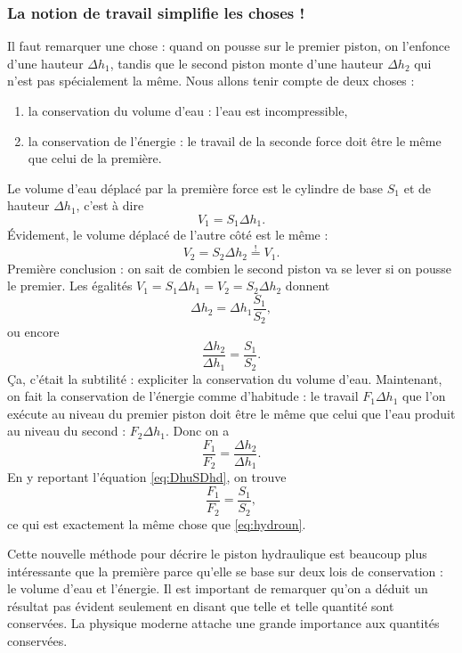 \documentclass[a4paper,12pt]{book}
\theoremstyle{mes_exemples}	\newtheorem{exemple}[numtho]{Exemple}
\theoremstyle{mes_tho}
\begin{document}
\subsubsection{La notion de travail simplifie les choses !}

Il faut remarquer une chose : quand on pousse sur le premier piston, on l'enfonce d'une hauteur $\Delta h_1$, tandis que le second piston monte d'une hauteur $\Delta h_2$ qui n'est pas spécialement la même. Nous allons tenir compte de deux choses :

\begin{enumerate}
\item la conservation du volume d'eau : l'eau est incompressible,
\item la conservation de l'énergie : le travail de la seconde force doit être le même que celui de la première. 
\end{enumerate}
Le volume d'eau déplacé par la première force est le cylindre de base $S_1$ et de hauteur $\Delta h_1$, c'est à dire
\[
   V_1=S_1\Delta h_1.
\]
Évidement, le volume déplacé de l'autre côté est le même :
\[
   V_2=S_2\Delta h_2\stackrel{!}{=}V_1.
\] 
Première conclusion : on sait de combien le second piston va se lever si on pousse le premier. Les égalités $V_1=S_1\Delta h_1=V_2=S_2\Delta h_2$ donnent 
\[
\Delta h_2=\Delta h_1\frac{S_1}{S_2},
\]
ou encore
\begin{equation}  \label{eq:DhuSDhd}
\frac{\Delta h_2}{\Delta h_1}=\frac{S_1}{S_2}.
\end{equation}
Ça, c'était la subtilité : expliciter la conservation du volume d'eau. Maintenant, on fait la conservation de l'énergie comme d'habitude : le travail $F_1\Delta h_1$ que l'on exécute au niveau du premier piston doit être le même que celui que l'eau produit au niveau du second : $F_2\Delta h_1$. Donc on a 
\[
    \frac{F_1}{F_2}=\frac{\Delta h_2}{\Delta h_1}.
\]
En y reportant l'équation \eqref{eq:DhuSDhd}, on trouve
\begin{equation}
\frac{F_1}{F_2}=\frac{S_1}{S_2},
\end{equation}
ce qui est exactement la même chose que \eqref{eq:hydroun}. 

Cette nouvelle méthode pour décrire le piston hydraulique est beaucoup plus intéressante que la première parce qu'elle se base sur deux lois de conservation : le volume d'eau et l'énergie. Il est important de remarquer qu'on a déduit un résultat pas évident seulement en disant que telle et telle quantité sont conservées. La physique moderne attache une grande importance aux quantités conservées.
\end{document}
